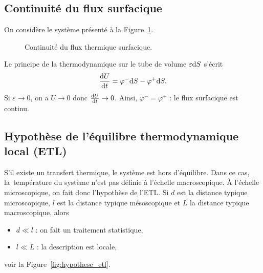     \subsection{Continuité du flux surfacique}

        On considère le système présenté à la Figure~\ref{fig:continuite_flux_surfacique}.

        \begin{figure}
            \centering
            \caption{Continuité du flux thermique surfacique.}    
            \label{fig:continuite_flux_surfacique}
        \end{figure}

        Le principe de la thermodynamique sur le tube de volume $\varepsilon\mathrm{d} S$ s'écrit
        \begin{equation*}
            \frac{\mathrm{d} U}{\mathrm{d} t}=\varphi^{-}\mathrm{d} S-\varphi^{+}\mathrm{d} S.
        \end{equation*}
        Si $\varepsilon\to0$, on a $U\to0$ donc $\frac{\mathrm{d} U}{\mathrm{d} t}\to0$. Ainsi, $\varphi^{-}=\varphi^{+}$ : le flux surfacique est continu.

    \subsection{Hypothèse de l'équilibre thermodynamique local (ETL)}

        S'il existe un transfert thermique, le système est hors d'équilibre. Dans ce cas, \og la\fg~température du système n'est pas définie à l'échelle macroscopique.
        À l'échelle microscopique, on fait donc l'hypothèse de l'ETL. Si $d$ est la distance typique microscopique, $l$ est la distance typique mésoscopique et $L$ la distance typique macroscopique, alors
        \begin{itemize}
            \item $d\ll l$ : on fait un traitement statistique,
            \item $l\ll L$ : la description est locale,
        \end{itemize}
        voir la Figure~\ref{fig:hypothese_etl}.

